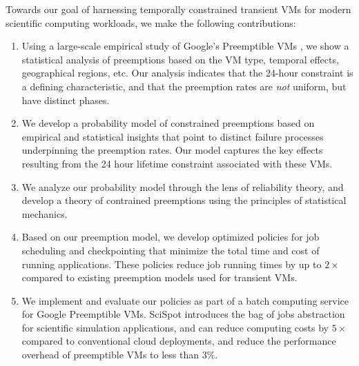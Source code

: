 Towards our goal of harnessing temporally constrained transient VMs for modern scientific computing workloads, 
we make the following contributions:
\begin{enumerate} [leftmargin=12pt]
\item Using a large-scale empirical study of Google's Preemptible VMs \footnotemark, we show a statistical analysis of preemptions based on the VM type, temporal effects, geographical regions, etc. Our analysis indicates that the 24-hour constraint is a defining characteristic, and that the preemption rates are \emph{not} uniform, but have distinct phases. 

\item We develop a probability model of constrained preemptions based on empirical and statistical insights that point to distinct failure processes underpinning the preemption rates. Our model captures the key effects resulting from the 24 hour lifetime constraint associated with these VMs.

\item We analyze our probability model through the lens of reliability theory, and develop a theory of contrained preemptions using the principles of statistical mechanics. 

  


\item Based on our preemption model, we develop optimized policies for job scheduling and checkpointing that minimize the total time and cost of running applications. These policies reduce job running times by up to $2\times$ compared to existing preemption models used for transient VMs. 
  

\item We implement and evaluate our policies as part of a batch computing service for Google Preemptible VMs. SciSpot introduces the bag of jobs abstraction for scientific simulation applications, and can reduce computing costs by $5\times$ compared to conventional cloud deployments, and reduce the performance overhead of preemptible VMs to less than $3\%$. 


\end{enumerate}
